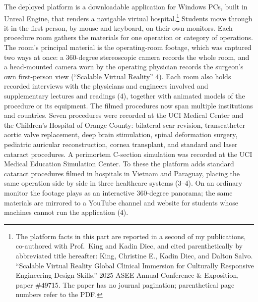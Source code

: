 The deployed platform is a downloadable application for Windows PCs, built in
Unreal Engine, that renders a navigable virtual hospital.\footnote{The platform
facts in this part are reported in a second of my publications, co-authored
with Prof.\ King and Kadin Diec, and cited parenthetically by abbreviated title
hereafter: King, Christine E., Kadin Diec, and Dalton Salvo. ``Scalable Virtual
Reality Global Clinical Immersion for Culturally Responsive Engineering Design
Skills.'' 2025 ASEE Annual Conference \& Exposition, paper \#49715.
The paper has no journal pagination; parenthetical page numbers refer to the
PDF.} Students move through it in the first person, by mouse and keyboard, on
their own monitors. Each procedure room gathers the materials for one
operation or category of operations. The room's principal material is the
operating-room footage, which was captured two ways at once: a 360-degree
stereoscopic camera records the whole room, and a head-mounted camera worn by
the operating physician records the surgeon's own first-person view
(``Scalable Virtual Reality'' 4). Each room also holds recorded interviews
with the physicians and engineers involved and supplementary lectures and
readings (4), together with animated models of the procedure or its
equipment. The filmed procedures now span multiple institutions and
countries. Seven procedures were recorded at the UCI Medical Center and the Children's
Hospital of Orange County: bilateral scar revision, transcatheter aortic
valve replacement, deep brain stimulation, spinal deformation surgery,
pediatric auricular reconstruction, cornea transplant, and standard and laser
cataract procedures. A perimortem C-section simulation was recorded at the
UCI Medical Education Simulation Center. To these the platform adds standard
cataract procedures filmed in hospitals in Vietnam and Paraguay, placing the
same operation side by side in three healthcare systems (3--4). On an ordinary monitor the footage plays as an interactive 360-degree
panorama; the same materials are mirrored to a YouTube channel and website for
students whose machines cannot run the application (4).

